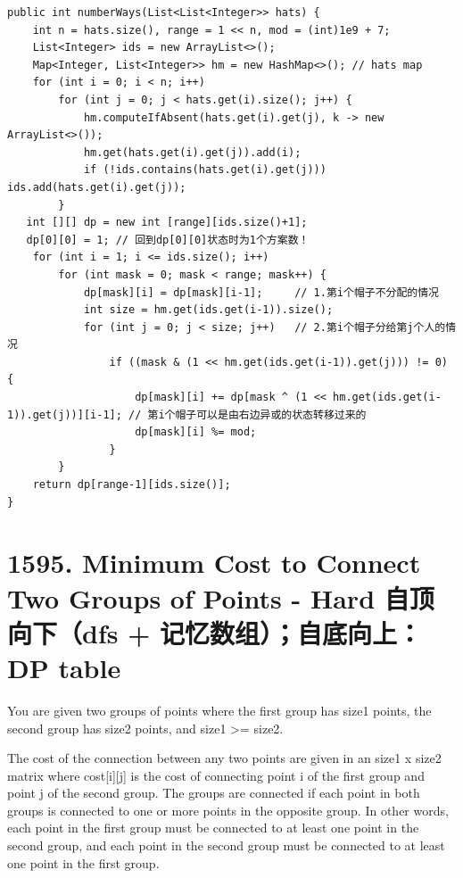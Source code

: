 \documentclass[9pt, b5paaper]{book}
\begin{document}
\begin{verbatim}
public int numberWays(List<List<Integer>> hats) {
    int n = hats.size(), range = 1 << n, mod = (int)1e9 + 7;
    List<Integer> ids = new ArrayList<>();
    Map<Integer, List<Integer>> hm = new HashMap<>(); // hats map
    for (int i = 0; i < n; i++) 
        for (int j = 0; j < hats.get(i).size(); j++) {
            hm.computeIfAbsent(hats.get(i).get(j), k -> new ArrayList<>());
            hm.get(hats.get(i).get(j)).add(i);
            if (!ids.contains(hats.get(i).get(j))) ids.add(hats.get(i).get(j));
        }
   int [][] dp = new int [range][ids.size()+1];
   dp[0][0] = 1; // 回到dp[0][0]状态时为1个方案数！
    for (int i = 1; i <= ids.size(); i++) 
        for (int mask = 0; mask < range; mask++) {
            dp[mask][i] = dp[mask][i-1];     // 1.第i个帽子不分配的情况
            int size = hm.get(ids.get(i-1)).size();
            for (int j = 0; j < size; j++)   // 2.第i个帽子分给第j个人的情况
                if ((mask & (1 << hm.get(ids.get(i-1)).get(j))) != 0) {
                    dp[mask][i] += dp[mask ^ (1 << hm.get(ids.get(i-1)).get(j))][i-1]; // 第i个帽子可以是由右边异或的状态转移过来的
                    dp[mask][i] %= mod;
                }
        }
    return dp[range-1][ids.size()];
}
\end{verbatim}
\section{1595. Minimum Cost to Connect Two Groups of Points - Hard 自顶向下（dfs + 记忆数组）；自底向上：DP table}
\label{sec-11-14}
You are given two groups of points where the first group has size1 points, the second group has size2 points, and size1 >= size2.

The cost of the connection between any two points are given in an size1 x size2 matrix where cost[i][j] is the cost of connecting point i of the first group and point j of the second group. The groups are connected if each point in both groups is connected to one or more points in the opposite group. In other words, each point in the first group must be connected to at least one point in the second group, and each point in the second group must be connected to at least one point in the first group.
\end{document}
